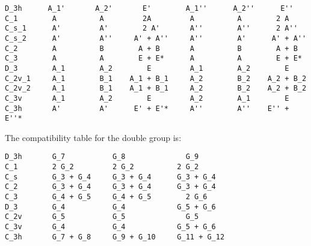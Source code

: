 \documentclass[12pt,a4paper,twoside]{report}
\begin{document}
\begin{tcolorbox}
\begin{footnotesize}
\begin{verbatim}
D_3h      A_1'       A_2'       E'        A_1''      A_2''      E''
C_1        A          A         2A         A          A        2 A
C_s_1      A'         A'        2 A'       A''        A''      2 A''
C_s_2      A'         A''     A' + A''     A''        A'      A' + A''
C_2        A          B        A + B       A          B        A + B
C_3        A          A        E + E*      A          A        E + E*
D_3        A_1        A_2        E         A_1        A_2        E
C_2v_1     A_1        B_1    A_1 + B_1     A_2        B_2    A_2 + B_2
C_2v_2     A_1        B_1    A_1 + B_1     A_2        B_2    A_2 + B_2
C_3v       A_1        A_2        E         A_2        A_1        E
C_3h       A'         A'      E' + E'*     A''        A''    E'' + E''*
\end{verbatim}
\end{footnotesize}
\end{tcolorbox}

The compatibility table for the double group is:

\begin{tcolorbox}
\begin{footnotesize}
\begin{verbatim}
D_3h       G_7           G_8              G_9
C_1        2 G_2         2 G_2          2 G_2
C_s        G_3 + G_4     G_3 + G_4      G_3 + G_4
C_2        G_3 + G_4     G_3 + G_4      G_3 + G_4
C_3        G_4 + G_5     G_4 + G_5        2 G_6
D_3        G_4           G_4            G_5 + G_6
C_2v       G_5           G_5              G_5
C_3v       G_4           G_4            G_5 + G_6
C_3h       G_7 + G_8     G_9 + G_10     G_11 + G_12
\end{verbatim}
\end{footnotesize}
\end{tcolorbox}
\end{document}
